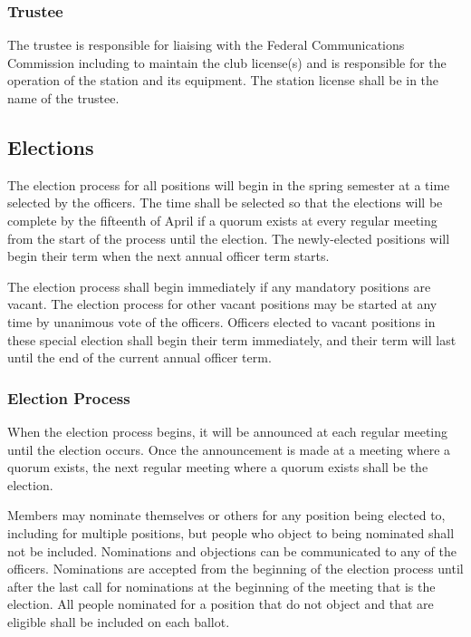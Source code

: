 \documentclass{article}
\begin{document}
\subsubsection{Trustee}

The trustee is responsible for liaising with the Federal Communications
Commission including to maintain the club license(s) and is responsible for the
operation of the station and its equipment. The station license shall be in the
name of the trustee.

\subsection{Elections}

The election process for all positions will begin in the spring semester at a
time selected by the officers. The time shall be selected so that the elections
will be complete by the fifteenth of April if a quorum exists at every regular
meeting from the start of the process until the election. The newly-elected
positions will begin their term when the next annual officer term starts.

The election process shall begin immediately if any mandatory positions are
vacant. The election process for other vacant positions may be started at any
time by unanimous vote of the officers. Officers elected to vacant positions in
these special election shall begin their term immediately, and their term will
last until the end of the current annual officer term.

\subsubsection{Election Process}

When the election process begins, it will be announced at each regular meeting
until the election occurs. Once the announcement is made at a meeting where a
quorum exists, the next regular meeting where a quorum exists shall be the
election.

Members may nominate themselves or others for any position being elected to,
including for multiple positions, but people who object to being nominated shall
not be included. Nominations and objections can be communicated to any of the
officers. Nominations are accepted from the beginning of the election process
until after the last call for nominations at the beginning of the meeting that
is the election. All people nominated for a position that do not object and that
are eligible shall be included on each ballot.
\end{document}
